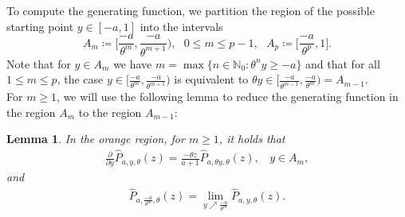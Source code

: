 \documentclass[12pt]{article}
\newcommand{\N}{\mathbb{N}} %
\newcommand{\1}{\mathds{1}}
\theoremstyle{definition}
\theoremstyle{plain}
\newtheorem{Lemma}[definition]{Lemma}
\theoremstyle{remark}
\newtheorem{Remark}{Remark}
\begin{document}
    To compute the generating function, we partition the region of the possible starting point $y\in[-a,1]$ into the intervals 
$$A_m\coloneqq\bigg[\frac{-a}{\theta^m},\frac{-a}{\theta^{m+1}}\bigg),~~~0\le m\le p-1,~~~A_p\coloneqq\bigg[\frac{-a}{\theta^p},1\bigg].$$ 
Note that for $y\in A_m$ we have $m=\max\{n\in\N_0:\theta^ny\geq-a\}$ and that for all $1\le m\le p$, the case $y\in\big[\frac{-a}{\theta^m},\frac{-a}{\theta^{m+1}}\big)$ is equivalent to  $\theta y\in\big[\frac{-a}{\theta^{m-1}},\frac{-a}{\theta^{m}}\big)= A_{m-1}$. 
\\For $m\ge1$, we will use the following lemma to reduce the generating function in the region $A_m$ to the region $A_{m-1}$:
\begin{Lemma}\label{orange_GF_reduction}
    In the orange region, for $m\ge1$, it holds that
    \begin{align} \label{eqn:orange:dglviadifferentregions}
       \frac{\partial}{\partial y}\hat{P}_{a,y,\theta}(z)   
    =\frac{-\theta z}{a+1}\hat{P}_{a,\theta y,\theta}(z),~~~~y\in A_m,
    \end{align}
    and
    \begin{align}\label{continuous_orange}
    \hat{P}_{a,\frac{-a}{\theta^{m}},\theta}(z)=\lim_{y\nearrow\frac{-a}{\theta^{m}}}\hat{P}_{a,y,\theta}(z).
\end{align}
\end{Lemma}
\end{document}
